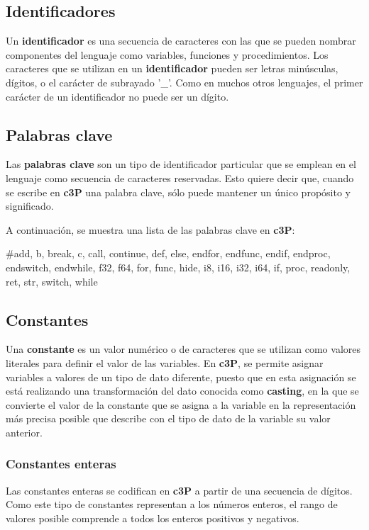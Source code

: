 \subsection{Identificadores}

Un \textbf{identificador} es una secuencia de caracteres con las que se pueden
nombrar componentes del lenguaje como variables, funciones y procedimientos. Los
caracteres que se utilizan en un \textbf{identificador} pueden ser letras minúsculas,
dígitos, o el carácter de subrayado '\_'. Como en muchos otros lenguajes, el primer
carácter de un identificador no puede ser un dígito.

\subsection{Palabras clave}

Las \textbf{palabras clave} son un tipo de identificador particular que se emplean en el
lenguaje como secuencia de caracteres reservadas. Esto quiere decir que, cuando se escribe
en \textbf{c3P} una palabra clave, sólo puede mantener un único propósito y significado.

A continuación, se muestra una lista de las palabras clave en \textbf{c3P}:

\#add, b, break, c, call, continue, def, else, endfor, endfunc, endif, endproc,
endswitch, endwhile, f32, f64, for, func, hide, i8, i16, i32, i64, if, proc,
readonly, ret, str, switch,  while

\subsection{Constantes}

Una \textbf{constante} es un valor numérico o de caracteres que se utilizan como valores
literales para definir el valor de las variables. En \textbf{c3P}, se permite asignar
variables a valores de un tipo de dato diferente, puesto que en esta asignación se
está realizando una transformación del dato conocida como \textbf{casting}, en la
que se convierte el valor de la constante que se asigna a la variable en la representación
más precisa posible que describe con el tipo de dato de la variable su valor anterior.

\subsubsection{Constantes enteras}

Las constantes enteras se codifican en \textbf{c3P} a partir de una secuencia de dígitos.
Como este tipo de constantes representan a los números enteros, el rango de valores posible
comprende a todos los enteros positivos y negativos.

